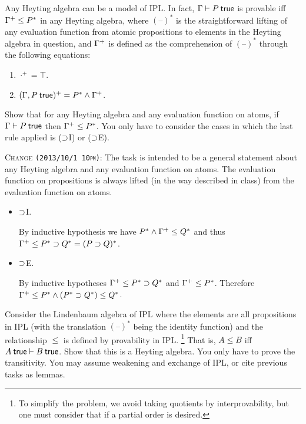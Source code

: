 \documentclass[12pt]{article}
\newcommand{\cut}[1]{}
\newcommand{\showsol}[1]{\color{FireBrick}#1\normalcolor}%
\newcommand{\showsol}[1]{\cut{#1}}%
\newenvironment{sol}{\trivlist \item[\hskip \labelsep{\bf
Solution:}]}{\endtrivlist}
\newcommand{\showextra}[1]{\color{DarkOliveGreen}#1\normalcolor}
\begin{document}
Any Heyting algebra can be a model of IPL.
In fact, $\ctx \entails P \true$ is provable iff $\Gamma^+ \leq P^*$ in any Heyting algebra,
where $(\text{--})^*$ is the straightforward lifting of
any evaluation function from atomic propositions
to elements in the Heyting algebra in question,
and $\Gamma^+$ is defined as the comprehension of $(\text{--})^*$
through the following equations:
\begin{enumerate}
  \item $\cdot^+ = \top$.
  \item $(\ctx, P\true)^+ = P^* \meet \ctx^+$.
\end{enumerate}

\begin{task}
  Show that for any Heyting algebra and any evaluation function on atoms,
  if $\ctx \entails P \true$ then $\Gamma^+ \leq P^*$.
  You only have to consider the cases in which the last rule applied is ($\supset$I) or ($\supset$E).
\end{task}

\showextra{
  \begin{mdframed}[style=extra]
    \textsc{Change \texttt{(2013/10/1 10pm)}:}
    The task is intended to be a general statement about any Heyting algebra
    and any evaluation function on atoms.  The evaluation function on propositions
    is always lifted (in the way described in class) from the evaluation function on atoms.
  \end{mdframed}
}

\showsol{
\begin{sol}\mbox{}
  \begin{itemize}
    \item $\supset$I.

      By inductive hypothesis we have
      $P^* \wedge \Gamma^+ \leq Q^*$
      and thus $\Gamma^+ \leq P^* \supset Q^* = (P \supset Q)^*$.
    \item $\supset$E.

      By inductive hypotheses $\Gamma^+ \leq P^* \supset Q^*$ and $\Gamma^+ \leq P^*$.
      Therefore $\Gamma^+ \leq P^* \wedge (P^* \supset Q^*) \leq Q^*$.
  \end{itemize}
\end{sol}
}

\begin{task}
  Consider the Lindenbaum algebra of IPL where
  the elements are all propositions in IPL
  (with the translation $(\text{--})^*$ being the identity function)
  and the relationship $\leq$ is defined by provability in IPL.%
  \footnote{To simplify the problem, we avoid taking quotients by interprovability,
  but one must consider that if a partial order is desired.}
  That is, $A \leq B$ iff $A \true \entails B \true$.
  Show that this is a Heyting algebra.
  You only have to prove the transitivity.
  You may assume weakening and exchange of IPL, or cite previous tasks as lemmas.
\end{task}
\end{document}
